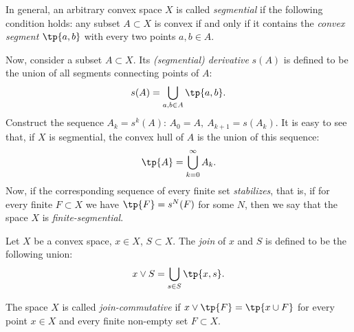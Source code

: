 \documentclass[12pt, a4paper]{article}
\begin{document}
\begin{definition}\label{def-segm}
    In general, an arbitrary convex space \(X\) is called \textit{segmential} if the following condition holds: any subset \(A \subset X\) is convex if and only if it contains the \textit{convex segment} \(\tp{a, b}\) with every two points \(a, b \in A\).

    Now, consider a subset \(A \subset X\). Its \textit{(segmential) derivative} \(s(A)\) is defined to be the union of all segments connecting points of \(A\): \[s(A) = \bigcup_{a, b \in A} \tp{a, b}.\] Construct the sequence \(A_k = s^k(A)\): \(A_0 = A, \ A_{k+1} = s(A_k)\). It is easy to see that, if \(X\) is segmential, the convex hull of \(A\) is the union of this sequence: \[\tp{A} = \bigcup_{k = 0}^{\infty} A_k.\] Now, if the corresponding sequence of every finite set \textit{stabilizes}, that is, if for every finite \(F \subset X\) we have \(\tp{F} = s^N(F)\) for some \(N\), then we say that the space \(X\) is \textit{finite-segmential}.
\end{definition}




\begin{definition}\label{def-join}
    Let \(X\) be a convex space, \(x \in X\), \(S \subset X\). The \textit{join} of \(x\) and \(S\) is defined to be the following union: \[x \vee S = \bigcup_{s \in S} \tp{x, s}.\]

    The space \(X\) is called \textit{join-commutative} if \(x \vee \tp{F} = \tp{x \cup F}\) for every point \(x \in X\) and every finite non-empty set \(F \subset X\).
\end{definition}
\end{document}
